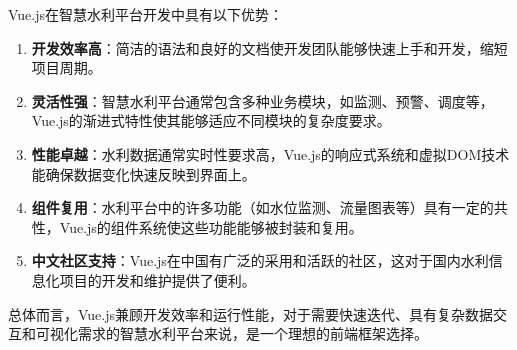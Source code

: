 Vue.js在智慧水利平台开发中具有以下优势：

\begin{enumerate}
\def\labelenumi{\arabic{enumi}.}
\item
  \textbf{开发效率高}：简洁的语法和良好的文档使开发团队能够快速上手和开发，缩短项目周期。
\item
  \textbf{灵活性强}：智慧水利平台通常包含多种业务模块，如监测、预警、调度等，Vue.js的渐进式特性使其能够适应不同模块的复杂度要求。
\item
  \textbf{性能卓越}：水利数据通常实时性要求高，Vue.js的响应式系统和虚拟DOM技术能确保数据变化快速反映到界面上。
\item
  \textbf{组件复用}：水利平台中的许多功能（如水位监测、流量图表等）具有一定的共性，Vue.js的组件系统使这些功能能够被封装和复用。
\item
  \textbf{中文社区支持}：Vue.js在中国有广泛的采用和活跃的社区，这对于国内水利信息化项目的开发和维护提供了便利。
\end{enumerate}

总体而言，Vue.js兼顾开发效率和运行性能，对于需要快速迭代、具有复杂数据交互和可视化需求的智慧水利平台来说，是一个理想的前端框架选择。
